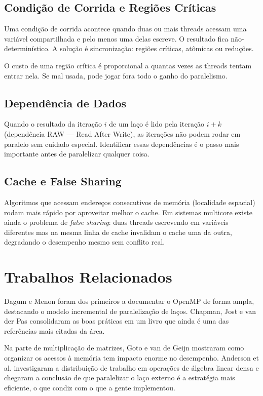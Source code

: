 \documentclass[12pt]{article}
\begin{document}
\subsection{Condição de Corrida e Regiões Críticas}

Uma condição de corrida acontece quando duas ou mais threads acessam uma variável compartilhada e pelo menos uma delas escreve. O resultado fica não-determinístico. A solução é sincronização: regiões críticas, atômicas ou reduções.

O custo de uma região crítica é proporcional a quantas vezes as threads tentam entrar nela. Se mal usada, pode jogar fora todo o ganho do paralelismo.

\subsection{Dependência de Dados}

Quando o resultado da iteração $i$ de um laço é lido pela iteração $i+k$ (dependência RAW --- Read After Write), as iterações não podem rodar em paralelo sem cuidado especial. Identificar essas dependências é o passo mais importante antes de paralelizar qualquer coisa.

\subsection{Cache e False Sharing}

Algoritmos que acessam endereços consecutivos de memória (localidade espacial) rodam mais rápido por aproveitar melhor o cache. Em sistemas multicore existe ainda o problema de \textit{false sharing}: duas threads escrevendo em variáveis diferentes mas na mesma linha de cache invalidam o cache uma da outra, degradando o desempenho mesmo sem conflito real.

\section{Trabalhos Relacionados}

Dagum e Menon \cite{dagum1998} foram dos primeiros a documentar o OpenMP de forma ampla, destacando o modelo incremental de paralelização de laços. Chapman, Jost e van der Pas \cite{chapman2007} consolidaram as boas práticas em um livro que ainda é uma das referências mais citadas da área.

Na parte de multiplicação de matrizes, Goto e van de Geijn \cite{goto2008} mostraram como organizar os acessos à memória tem impacto enorme no desempenho. Anderson et al. \cite{anderson1999} investigaram a distribuição de trabalho em operações de álgebra linear densa e chegaram a conclusão de que paralelizar o laço externo é a estratégia mais eficiente, o que condiz com o que a gente implementou.
\end{document}
